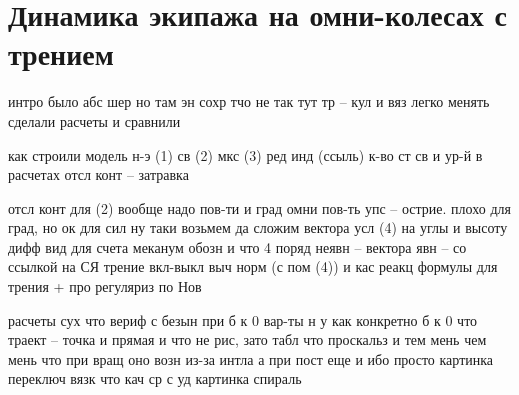 \chapter{Динамика экипажа на омни-колесах с трением}

интро
    было абс шер но там эн сохр тчо не так
    тут тр -- кул и вяз
    легко менять
    сделали расчеты и сравнили

как строили модель
    н-э (1) св (2) мкс (3)
    ред инд (ссыль)
    к-во ст св и ур-й в расчетах
    отсл конт -- затравка

отсл конт
    для (2) вообще надо пов-ти и град
    омни
        пов-ть
        упс -- острие. плохо для град, но ок для сил 
        ну таки возьмем да сложим вектора
        усл (4) на углы и высоту
        дифф вид для счета
    меканум
        обозн и что 4 поряд
        неявн -- вектора
        явн -- со ссылкой на СЯ
    трение
        вкл-выкл
        выч норм (с пом (4)) и кас реакц
        формулы для трения + про регуляриз по Нов
        
расчеты
    сух
        что вериф с безын при б к 0
        вар-ты н у
        как конкретно б к 0
        что траект -- точка и прямая и что не рис, зато табл
        что проскальз и тем мень чем мень
        что при вращ оно возн из-за интла а при пост еще и ибо просто
        картинка переключ
    вязк
        что кач ср с уд
        картинка спираль
    